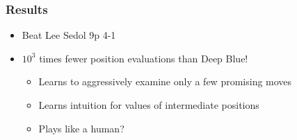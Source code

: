 \documentclass{beamer}
\begin{document}
\begin{frame}
  \frametitle{Results}
  \begin{itemize}
  \item Beat Lee Sedol 9p 4-1
  \item $10^3$ times fewer position evaluations than Deep Blue!
    \begin{itemize}
    \item Learns to aggressively examine only a few promising moves
    \item Learns intuition for values of intermediate positions
    \item Plays like a human?
    \end{itemize}
  \end{itemize}
\end{frame}
\end{document}
